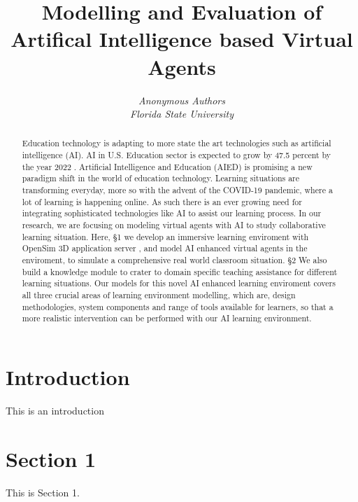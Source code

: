 \documentclass[letterpaper,12pt]{article}
\title{\large \textbf{Modelling and Evaluation of Artifical Intelligence based Virtual Agents}}
\author{\textit{Anonymous Authors}\\
\textit{Florida State University}}
\date{}
\begin{document}
\maketitle

\thispagestyle{empty}
\pagestyle{empty}


\begin{abstract}
\noindent Education technology is adapting to more state the art
technologies such as artificial intelligence (AI). AI in
U.S. Education sector is expected to grow by 47.5 percent by the year 2022 \cite{RefWorks:1}.
Artificial Intelligence and Education (AIED) is promising a new paradigm shift 
in 
the world of education technology. Learning situations are transforming 
everyday, more so with the advent of the COVID-19 pandemic, where a lot 
of learning is happening online. As such there 
is an ever growing need for integrating sophisticated technologies like AI to assist
our learning process. In our research, we are focusing on 
modeling virtual agents with AI to study 
collaborative learning situation. Here, \S 1 we develop an immersive learning enviroment with
OpenSim 3D application server \cite{RefWorks:2}, and model AI enhanced virtual agents in the enviroment, to simulate
a comprehensive real world classroom situation. \S 2 We also build a knowledge 
module to crater to domain specific teaching assistance for different learning situations.
Our models for this novel AI enhanced learning enviroment 
covers all three crucial areas of learning environment modelling, which are,   
design methodologies, system components and range of tools 
available for learners, so that a more realistic intervention 
can be performed 
with our AI learning environment.
\end{abstract}

\section*{Introduction}
This is an introduction 



\section{Section 1}
This is Section 1.
\end{document}
